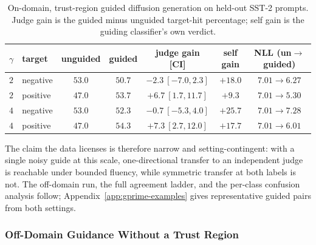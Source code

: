 \begin{table}[htbp]
    \centering
    \small
    \setlength{\tabcolsep}{4pt}
    \begin{tabular}{llccccc}
        \toprule
        $\gamma$ & target & unguided & guided & judge gain [CI] & self gain & NLL (un$\to$guided) \\
        \midrule
        $2$ & negative & $53.0$ & $50.7$ & $-2.3\ [-7.0, 2.3]$   & $+18.0$ & $7.01\to6.27$ \\
        $2$ & positive & $47.0$ & $53.7$ & $+6.7\ [1.7, 11.7]$   & $+9.3$  & $7.01\to5.30$ \\
        $4$ & negative & $53.0$ & $52.3$ & $-0.7\ [-5.3, 4.0]$   & $+25.7$ & $7.01\to7.28$ \\
        $4$ & positive & $47.0$ & $54.3$ & $+7.3\ [2.7, 12.0]$   & $+17.7$ & $7.01\to6.01$ \\
        \bottomrule
    \end{tabular}
    \caption[On-domain trust-region guided diffusion generation, held-out SST-2 prompts.]{On-domain, trust-region guided diffusion generation on held-out SST-2 prompts. Judge gain is the guided minus unguided target-hit percentage; self gain is the guiding classifier's own verdict.}
    \label{tab:gprime}
\end{table}

The claim the data licenses is therefore narrow and setting-contingent: with a single noisy guide at this scale, one-directional transfer to an independent judge is reachable under bounded fluency, while symmetric transfer at both labels is not. The off-domain run, the full agreement ladder, and the per-class confusion analysis follow; Appendix~\ref{app:gprime-examples} gives representative guided pairs from both settings.

\subsubsection{Off-Domain Guidance Without a Trust Region}
\label{app:guided-offdomain}

